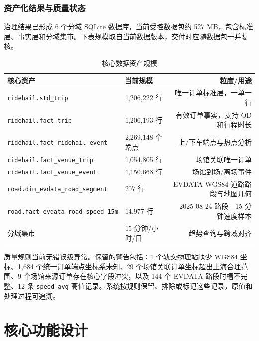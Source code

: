 \documentclass[a4paper,11pt]{article}
\newcommand{\code}[1]{\texttt{#1}}
\begin{document}
\subsubsection{资产化结果与质量状态}

治理结果已形成 6 个分域 SQLite 数据库，当前受控数据包约 527 MB，包含标准层、事实层和分域集市。下表规模取自当前数据版本，交付时应随数据包一并复核。

\begin{table}[ht]
  \centering
  \caption{核心数据资产规模}
  \label{tab:assets}
  \begin{tabularx}{\linewidth}{@{}lXr@{}}
    \toprule
    \rowcolor{TableHead}
    \sffamily\bfseries 核心资产 & \sffamily\bfseries 当前规模 & \sffamily\bfseries 粒度/用途 \\
    \midrule
    \code{ridehail.std\_trip}                    & 1,206,222 行 & 唯一订单标准层，一单一行 \\
    \code{ridehail.fact\_trip}                   & 1,206,193 行 & 有效订单事实，支持 OD 和行程时长 \\
    \code{ridehail.fact\_ridehail\_event}        & 2,269,148 个端点 & 上/下车端点与热点分析 \\
    \code{ridehail.fact\_venue\_trip}            & 1,054,805 行 & 场馆关联唯一订单 \\
    \code{ridehail.fact\_venue\_event}           & 1,150,668 行 & 场馆到场/离场事件 \\
    \code{road.dim\_evdata\_road\_segment}       & 207 行       & EVDATA WGS84 道路路段与地图几何 \\
    \code{road.fact\_evdata\_road\_speed\_15m}   & 14,977 行    & 2025-08-24 路段—15 分钟速度样本 \\
    分域集市                                        & 15 分钟/小时/日 & 趋势查询与跨域对齐 \\
    \bottomrule
  \end{tabularx}
\end{table}

质量规则当前无错误级异常。保留的警告包括：1 个轨交物理站缺少 WGS84 坐标、1,684 个统一订单端点坐标系未知、29 个场馆关联订单坐标超出上海合理范围、9 个场馆来源订单存在核心字段冲突，以及 144 个 EVDATA 路段时槽不完整、12 条 \code{speed\_avg} 高值记录。系统按规则保留、排除或标记这些记录，原值和处理过程可追溯。

\newpage
\section{核心功能设计}
\end{document}
